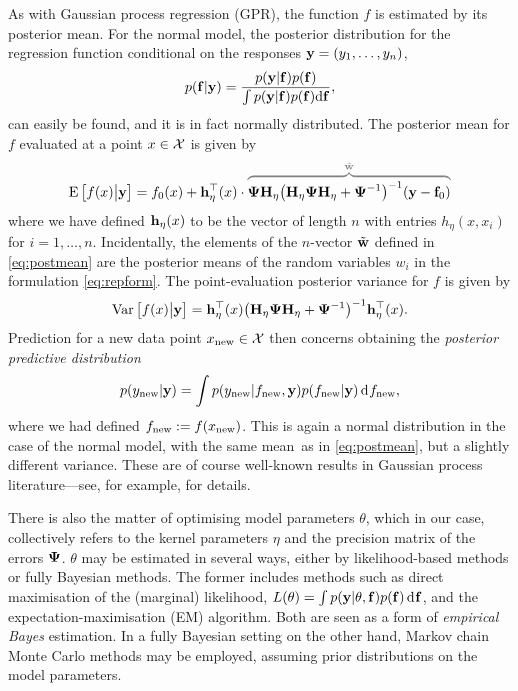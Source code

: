 \documentclass[a4paper,showframe,11pt]{report}
\begin{document}
As with Gaussian process regression (GPR), the function $f$ is estimated by its posterior mean.
For the normal model, the posterior distribution for the regression function conditional on the responses ${\mathbf y} = (y_1,\dots,y_n)$,
%
\begin{align}
  p({\mathbf f}|{\mathbf y}) = \frac{p({\mathbf y}|{\mathbf f})p({\mathbf f})}{\int p({\mathbf y}|{\mathbf f})p({\mathbf f}) \text{d} {\mathbf f}},
\end{align}
%
can easily be found, and it is in fact normally distributed.
The posterior mean for $f$ evaluated at a point $x \in {\mathcal X}$ is given by
%
\begin{align}\label{eq:postmean}
  \E\big[f(x)\big|\by\big] = f_0(x) + \bh_\eta^\top(x) \cdot
  {\color{gray}
  \overbrace{\color{black} \bPsi\bH_\eta \big(\bH_\eta\bPsi\bH_\eta + \bPsi^{-1}\big)^{-1} (\by -\bff_0 )}^{\tilde \bw}
  }
\end{align}
%
where we have defined ${\mathbf h}_\eta(x)$ to be the vector of length $n$ with entries $h_\eta(x,x_i)$ for $i=1,\dots,n$.
Incidentally, the elements of the $n$-vector $\tilde {{\mathbf w}}$ defined in \cref{eq:postmean} are the posterior means of the random variables $w_i$ in the formulation \cref{eq:repform}.
The point-evaluation posterior variance for $f$ is given by
%
\begin{align}\label{eq:postvar}
  \operatorname{Var}\big[f(x)\big|{\mathbf y}\big] = {\mathbf h}_\eta^\top(x)\big( {\mathbf H}_\eta{\bm\Psi}{\mathbf H}_\eta + {\bm\Psi}^{-1} \big)^{-1} {\mathbf h}_\eta^\top(x).
\end{align}
%
Prediction for a new data point $x_{\text{new}} \in {\mathcal X}$ then concerns obtaining the \emph{posterior predictive distribution}
%
\[
  p(y_{\text{new}}|{\mathbf y}) = \int p(y_{\text{new}}|f_{\text{new}},{\mathbf y})p(f_{\text{new}}|{\mathbf y}) \operatorname{d}\hspace{0.5pt}\! f_{\text{new}},
\]
%
where we had defined $f_{\text{new}} := f(x_{\text{new}})$.
This is again a normal distribution in the case of the normal model, with the same mean\footnotemark~as in \cref{eq:postmean}, but a slightly different variance.
These are of course well-known results in Gaussian process literature---see, for example, \citet{rasmussen2006gaussian} for details.


There is also the matter of optimising model parameters $\theta$, which in our case, collectively refers to the kernel parameters $\eta$ and the precision matrix of the errors ${\bm\Psi}$.
$\theta$ may be estimated in several ways, either by likelihood-based methods or fully Bayesian methods.
The former includes methods such as direct maximisation of the (marginal) likelihood, $L(\theta) = \int p({\mathbf y}|\theta,{\mathbf f})p({\mathbf f})\operatorname{d}\hspace{0.5pt}\! {\mathbf f}$, and the expectation-maximisation (EM) algorithm.
Both are seen as a form of \emph{empirical Bayes} estimation.
In a fully Bayesian setting on the other hand, Markov chain Monte Carlo methods may be employed, assuming prior distributions on the model parameters.
\end{document}

